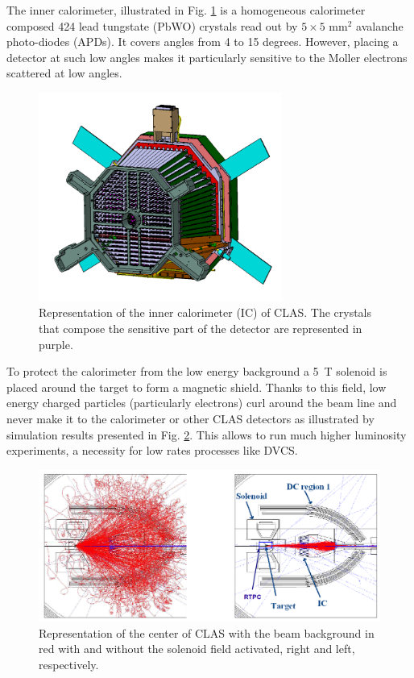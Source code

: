 \documentclass[aps,prc,preprint,superscriptaddress]{revtex4}
\begin{document}
The inner calorimeter, illustrated in Fig. \ref{fig:IC} is a homogeneous 
calorimeter composed 424 lead tungstate 
(PbWO) crystals read out by $5 \times 5$ mm$^2$ avalanche photo-diodes (APDs). 
It covers angles from 4 to 15 degrees. However, placing a detector at such low angles makes it 
particularly sensitive to the Moller electrons scattered at low angles.

\begin{figure}[tbp!]
\center
\includegraphics[width=8cm]{fig3/IC-CLAS.png}
	\caption{Representation of the inner calorimeter (IC) of CLAS. The crystals that compose the
	sensitive part of the detector are represented in purple.}
\label{fig:IC}
\end{figure}

To protect the calorimeter from the low energy background a 5~T solenoid is 
placed around the target to form
a magnetic shield. Thanks to this field, low energy charged particles (particularly 
electrons) curl around the beam line 
and never make it to the calorimeter or other CLAS detectors as illustrated 
by simulation results presented 
in Fig. \ref{fig:Solenoid}. This allows to run much higher luminosity experiments,
a necessity for low rates processes like DVCS.

\begin{figure}[tbp!]
\center
\includegraphics[width=14cm]{fig3/solenoid.png}
\caption{Representation of the center of CLAS with the beam background in red with and without
	the solenoid field activated, right and left, respectively.}
\label{fig:Solenoid}
\end{figure}
\end{document}
